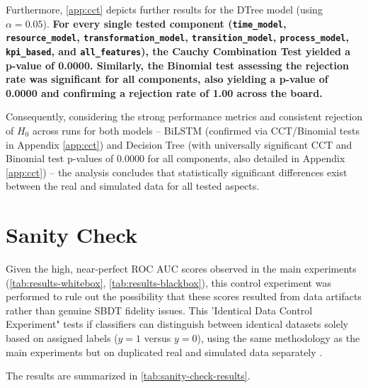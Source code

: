 Furthermore, \autoref{app:cct} depicts further results for the DTree model (using $\alpha = 0.05$). \textbf{For every single tested component (\texttt{time\_model}, \texttt{resource\_model}, \texttt{transformation\_model}, \texttt{transition\_model}, \texttt{process\_model}, \texttt{kpi\_based}, and \texttt{all\_features}), the Cauchy Combination Test yielded a p-value of 0.0000. Similarly, the Binomial test assessing the rejection rate was significant for all components, also yielding a p-value of 0.0000 and confirming a rejection rate of 1.00 across the board.}

Consequently, considering the strong performance metrics and consistent rejection of $H_0$ across runs for both models – BiLSTM (confirmed via CCT/Binomial tests in Appendix \ref{app:cct}) and Decision Tree (with universally significant CCT and Binomial test p-values of 0.0000 for all components, also detailed in Appendix \ref{app:cct}) – the analysis concludes that statistically significant differences exist between the real and simulated data for all tested aspects.



\section{Sanity Check}
\label{sec:sanity-check}

Given the high, near-perfect ROC AUC scores observed in the main experiments (\autoref{tab:results-whitebox}, \autoref{tab:results-blackbox}), this control experiment was performed to rule out the possibility that these scores resulted from data artifacts rather than genuine SBDT fidelity issues. This 'Identical Data Control Experiment" tests if classifiers can distinguish between identical datasets solely based on assigned labels ($y=1$ versus $y=0$), using the same methodology as the main experiments but on duplicated real and simulated data separately \autocite{adebayo2018sanity}.

The results are summarized in \autoref{tab:sanity-check-results}.


